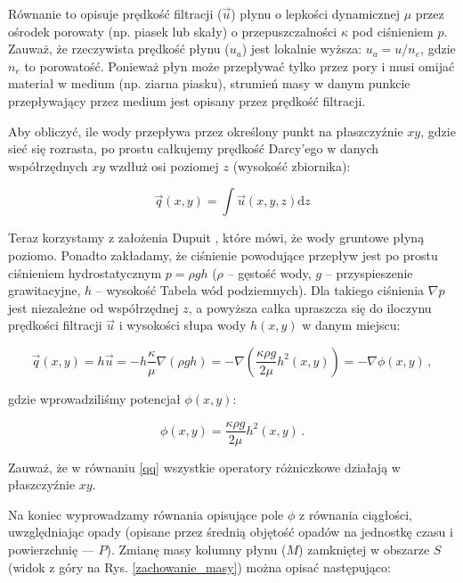 \documentclass[]{pracamgr}
\begin{document}
      Równanie to opisuje prędkość filtracji ($\vec{u}$) płynu o lepkości dynamicznej $\mu$ przez ośrodek porowaty (np. piasek lub skały) o przepuszczalności $\kappa$ pod ciśnieniem $p$. Zauważ, że rzeczywista prędkość płynu ($u_a$) jest lokalnie wyższa: $u_a = u / n_e$, gdzie $n_e$ to porowatość. Ponieważ płyn może przepływać tylko przez pory i musi omijać materiał w medium (np. ziarna piasku), strumień masy w danym punkcie przepływający przez medium jest opisany przez prędkość filtracji.
    
      Aby obliczyć, ile wody przepływa przez określony punkt na płaszczyźnie $xy$, gdzie sieć się rozrasta, po prostu całkujemy prędkość Darcy'ego w danych współrzędnych $xy$ wzdłuż osi poziomej $z$ (wysokość zbiornika):
      
      \begin{equation}
        \vec{q}(x,y)=\int \vec{u}(x,y,z)\textrm{d}z
      \end{equation}
    
      Teraz korzystamy z założenia Dupuit \cite{dupuit1863etudes}, które mówi, że wody gruntowe płyną poziomo. Ponadto zakładamy, że ciśnienie powodujące przepływ jest po prostu ciśnieniem hydrostatycznym $p = \rho g h $ ($\rho$ -- gęstość wody, $g$ -- przyspieszenie grawitacyjne, $h$ -- wysokość Tabela wód podziemnych). Dla takiego ciśnienia $\nabla p$ jest niezależne od współrzędnej $z$, a powyższa całka upraszcza się do iloczynu prędkości filtracji $\vec{u}$ i wysokości słupa wody $h(x, y)$ w danym miejscu:
      
      \begin{equation}
        \label{qq}
        \vec{q}(x,y)=h\vec{u}=-h \frac{\kappa}{\mu} \nabla(\rho g h)=-\nabla \left(\frac{\kappa \rho g}{2\mu}h^2(x,y)\right) = - \nabla \phi(x,y) \,,
      \end{equation}
      
      gdzie wprowadziliśmy potencjał $\phi(x,y)$:
      
      \begin{equation}
        \phi(x,y) = \frac{\kappa \rho g}{2\mu}h^2(x,y) \,.
      \end{equation}

      Zauważ, że w równaniu \eqref{qq} wszystkie operatory różniczkowe działają w płaszczyźnie $xy$.
    
      Na koniec wyprowadzamy równania opisujące pole $\phi$ z równania ciągłości, uwzględniając opady (opisane przez średnią objętość opadów na jednostkę czasu i powierzchnię — $P$). Zmianę masy kolumny płynu ($M$) zamkniętej w obszarze $S$ (widok z góry na Rys. \ref{zachowanie_masy}) można opisać następująco:
    
\end{document}
